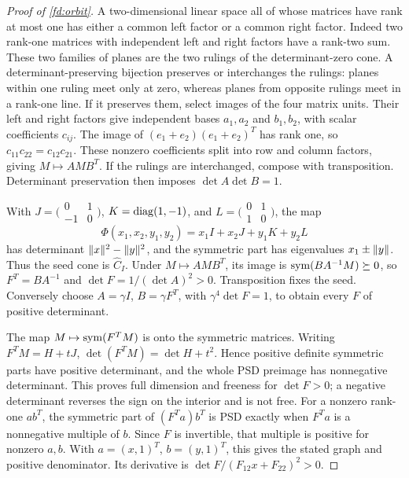 \begin{proof}[Proof of \cref{fd:orbit}]
\label{fd:orbit-proof}
A two-dimensional linear space all of whose matrices have rank
at most one has either a common left factor or a common right
factor. Indeed two rank-one matrices with independent left and
right factors have a rank-two sum. These two families of planes
are the two rulings of the determinant-zero cone.
A determinant-preserving bijection preserves or interchanges the
rulings: planes within one ruling meet only at zero, whereas
planes from opposite rulings meet in a rank-one line.
If it preserves them, select images of the four matrix units.
Their left and right factors give independent bases $a_1,a_2$
and $b_1,b_2$, with scalar coefficients $c_{ij}$.
The image of $(e_1+e_2)(e_1+e_2)^T$ has rank one, so
$c_{11}c_{22}=c_{12}c_{21}$. These nonzero coefficients split into
row and column factors, giving $M\mapsto AMB^T$.
If the rulings are interchanged, compose with transposition.
Determinant preservation then imposes $\det A\det B=1$.

With $J=\bigl(\begin{smallmatrix}0&1\\-1&0\end{smallmatrix}\bigr)$,
$K=\operatorname{diag}(1,-1)$, and
$L=\bigl(\begin{smallmatrix}0&1\\1&0\end{smallmatrix}\bigr)$, the map
\[
 \Phi(x_1,x_2,y_1,y_2)=x_1I+x_2J+y_1K+y_2L
\]
has determinant $\lVert x\rVert^2-\lVert y\rVert^2$, and the symmetric part
has eigenvalues $x_1\pm\lVert y\rVert$. Thus the seed cone is
$\widehat C_I$. Under $M\mapsto AMB^T$, its image is
$\operatorname{sym}(BA^{-1}M)\succeq0$, so $F^T=BA^{-1}$ and
$\det F=1/(\det A)^2>0$. Transposition fixes the seed.
Conversely choose $A=\gamma I$, $B=\gamma F^T$, with
$\gamma^4\det F=1$, to obtain every $F$ of positive determinant.

The map $M\mapsto\operatorname{sym}(F^TM)$ is onto the symmetric matrices.
Writing $F^TM=H+tJ$,
$\det(F^TM)=\det H+t^2$. Hence positive definite symmetric
parts have positive determinant, and the whole PSD preimage
has nonnegative determinant. This proves full dimension and
freeness for $\det F>0$; a negative determinant reverses the
sign on the interior and is not free.
For a nonzero rank-one $ab^T$, the symmetric part of
$(F^Ta)b^T$ is PSD exactly when $F^Ta$ is a nonnegative
multiple of $b$. Since $F$ is invertible, that multiple is
positive for nonzero $a,b$.
With $a=(x,1)^T$, $b=(y,1)^T$, this gives the stated graph
and positive denominator. Its derivative is
$\det F/(F_{12}x+F_{22})^2>0$.
\end{proof}

